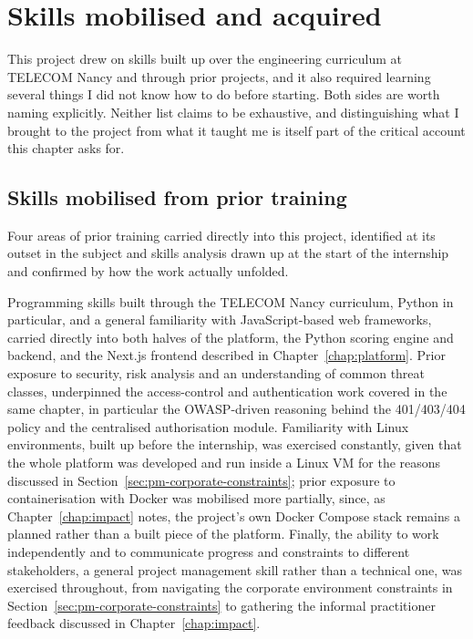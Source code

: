 \section{Skills mobilised and acquired}
\label{sec:pm-skills}

This project drew on skills built up over the engineering curriculum at TELECOM Nancy and through prior projects, and it also required learning several things I did not know how to do before starting. Both sides are worth naming explicitly. Neither list claims to be exhaustive, and distinguishing what I brought to the project from what it taught me is itself part of the critical account this chapter asks for.

\subsection{Skills mobilised from prior training}
\label{sec:pm-skills-mobilised}

Four areas of prior training carried directly into this project, identified at its outset in the subject and skills analysis drawn up at the start of the internship and confirmed by how the work actually unfolded.

Programming skills built through the TELECOM Nancy curriculum, Python in particular, and a general familiarity with JavaScript-based web frameworks, carried directly into both halves of the platform, the Python scoring engine and backend, and the Next.js frontend described in Chapter~\ref{chap:platform}. Prior exposure to security, risk analysis and an understanding of common threat classes, underpinned the access-control and authentication work covered in the same chapter, in particular the OWASP-driven reasoning behind the 401/403/404 policy and the centralised authorisation module. Familiarity with Linux environments, built up before the internship, was exercised constantly, given that the whole platform was developed and run inside a Linux VM for the reasons discussed in Section~\ref{sec:pm-corporate-constraints}; prior exposure to containerisation with Docker was mobilised more partially, since, as Chapter~\ref{chap:impact} notes, the project's own Docker Compose stack remains a planned rather than a built piece of the platform. Finally, the ability to work independently and to communicate progress and constraints to different stakeholders, a general project management skill rather than a technical one, was exercised throughout, from navigating the corporate environment constraints in Section~\ref{sec:pm-corporate-constraints} to gathering the informal practitioner feedback discussed in Chapter~\ref{chap:impact}.

